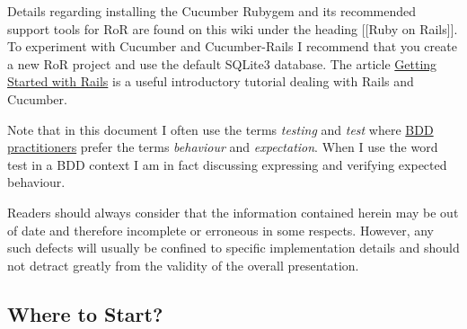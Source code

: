 \documentclass[10pt]{book}
\begin{document}
Details regarding installing the Cucumber Rubygem and its recommended support tools for RoR are found on this wiki under the heading  [[Ruby on Rails]].  To experiment with Cucumber and Cucumber-Rails I recommend that you create a new RoR project and use the default SQLite3 database.  The article \href{http://www.ultrasaurus.com/code/2008/12/getting-started-with-rails.html}{Getting Started with Rails} is a useful introductory tutorial dealing with Rails and Cucumber.

Note that in this document I often use the terms \emph{testing} and \emph{test} where \href{http://dannorth.net/introducing-bdd}{BDD practitioners} prefer the terms \emph{behaviour} and \emph{expectation}.  When I use the word test in a BDD context I am in fact discussing expressing and verifying expected behaviour.

Readers should always consider that the information contained herein may be out of date and therefore incomplete or erroneous in some respects.  However, any such defects will usually be confined to specific implementation details and should not detract greatly from the validity of the overall presentation.

\subsection{Where to Start?}
\end{document}
